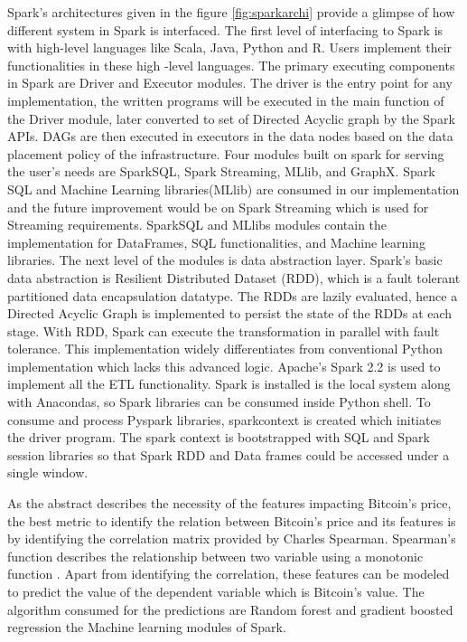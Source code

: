 \documentclass[sigconf]{acmart}
\begin{document}
Spark's architectures given in the figure \ref{fig:sparkarchi} provide a glimpse of how different system in Spark is interfaced. The first level of interfacing to Spark is with high-level languages like Scala, Java, Python and R. Users implement their functionalities in these high -level languages. The primary executing components in Spark are Driver and Executor modules. The driver is the entry point for any implementation, the written programs will be executed in the main function of the Driver module, later converted to set of Directed Acyclic graph by the Spark APIs. DAGs are then executed in executors in the data nodes based on the data placement policy of the infrastructure. Four modules built on spark for serving the user's needs are SparkSQL, Spark Streaming, MLlib, and GraphX. Spark SQL and Machine Learning libraries(MLlib) are consumed in our implementation and the future improvement would be on Spark Streaming which is used for Streaming requirements. SparkSQL and MLlibs modules contain the implementation for DataFrames, SQL functionalities, and Machine learning libraries. The next level of the modules is data abstraction layer. Spark's basic data abstraction is Resilient Distributed Dataset (RDD), which is a fault tolerant partitioned data encapsulation datatype. The RDDs are lazily evaluated, hence a Directed Acyclic Graph is implemented to persist the state of the RDDs at each stage. With RDD, Spark can execute the transformation in parallel with fault tolerance. This implementation widely differentiates from conventional Python implementation which lacks this advanced logic.
Apache's Spark 2.2 is used to implement all the ETL functionality. Spark is installed is the local system along with Anacondas, so Spark libraries can be consumed inside Python shell. To consume and process Pyspark libraries, sparkcontext is created which initiates the driver program. The spark context is bootstrapped with SQL and Spark session libraries so that Spark RDD and Data frames could be accessed under a single window.

As the abstract describes the necessity of the features impacting Bitcoin's price, the best metric to identify the relation between Bitcoin's price and its features is by identifying the correlation matrix provided by Charles Spearman. Spearman's function describes the relationship between two variable using a monotonic function \cite{Spearman9:online}. Apart from identifying the correlation, these features can be modeled to predict the value of the dependent variable which is Bitcoin's value. The algorithm consumed for the predictions are Random forest and gradient boosted regression the Machine learning modules of Spark.
\end{document}
